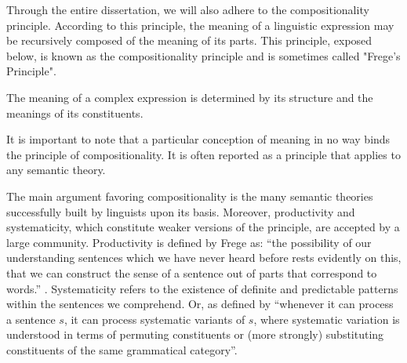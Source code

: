Through the entire dissertation, we will also adhere to the compositionality principle. According to this principle, the meaning of a linguistic expression may be recursively composed of the meaning of its parts. This principle, exposed below, is known as the compositionality principle and is sometimes called "Frege's Principle".

\begin{kaobox}[frametitle=The principle of semantic compositionality:]
The meaning of a complex expression is determined by its structure and the meanings of its constituents.
\end{kaobox}

It is important to note that a particular conception of meaning in no way binds the principle of compositionality. It is often reported as a principle that applies to any semantic theory.

The main argument favoring compositionality is the many semantic theories successfully built by linguists upon its basis. Moreover, productivity and systematicity, which constitute weaker versions of the principle, are accepted by a large community. Productivity is defined by Frege as: ``the possibility of our understanding sentences which we have never heard before rests evidently on this, that we can construct the sense of a sentence out of parts that correspond to words.'' \parencite{frege_14}. Systematicity refers to the existence of definite and predictable patterns within the sentences we comprehend. Or, as defined by \textcite{cummins_96} ``whenever it can process a sentence $s$, it can process systematic variants of $s$, where systematic variation is understood in terms of permuting constituents or (more strongly) substituting constituents of the same grammatical category''.


